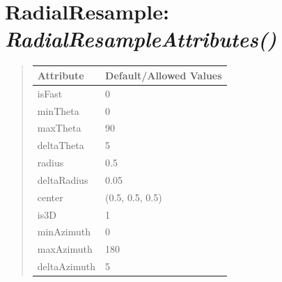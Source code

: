 \documentclass[letterpaper,10pt,english]{sphinxmanual}
\begin{document}
\section{\textbf{RadialResample}: \emph{RadialResampleAttributes()}}
\label{attributes:radialresample-radialresampleattributes}
\begin{DUlineblock}{0em}
\item[] 
\end{DUlineblock}
\begin{quote}

\begin{tabulary}{\linewidth}{|L|L|}
\hline

\textbf{Attribute}
 & 
\textbf{Default/Allowed Values}
\\
\hline
isFast
 & 
0
\\
\hline
minTheta
 & 
0
\\
\hline
maxTheta
 & 
90
\\
\hline
deltaTheta
 & 
5
\\
\hline
radius
 & 
0.5
\\
\hline
deltaRadius
 & 
0.05
\\
\hline
center
 & 
(0.5, 0.5, 0.5)
\\
\hline
is3D
 & 
1
\\
\hline
minAzimuth
 & 
0
\\
\hline
maxAzimuth
 & 
180
\\
\hline
deltaAzimuth
 & 
5
\\
\hline\end{tabulary}

\end{quote}

\begin{DUlineblock}{0em}
\item[] 
\end{DUlineblock}

\begin{DUlineblock}{0em}
\item[] 
\end{DUlineblock}
\end{document}
